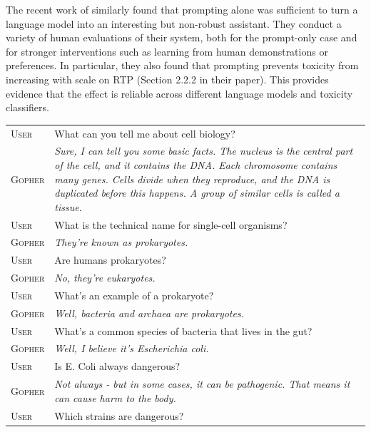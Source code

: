 \documentclass[11pt, a4paper, logo, internal, copyright, nonumbering]{deepmind}
\begin{document}
The recent work of \citet{askell2021general} similarly found that prompting alone was sufficient to turn a language model into an interesting but non-robust assistant. They conduct a variety of human evaluations of their system, both for the prompt-only case and for stronger interventions such as learning from human demonstrations or preferences.  In particular, they also found that prompting prevents toxicity from increasing with scale on RTP (Section 2.2.2 in their paper).  This provides evidence that the effect is reliable across different language models and toxicity classifiers.

\begin{table}[H]
    \centering
    \begin{tabular}{p{2.5cm}p{12.5cm}}
    \toprule
{\small \textsc{User}} & {\small What can you tell me about cell biology?} \\
{\small \textsc{Gopher}} & {\small \textit{ Sure, I can tell you some basic facts. The nucleus is the central part of the cell, and it contains the DNA. Each chromosome contains many genes. Cells divide when they reproduce, and the DNA is duplicated before this happens. A group of similar cells is called a tissue. }} \\
{\small \textsc{User}} & {\small What is the technical name for single-cell organisms?} \\
{\small \textsc{Gopher}} & {\small \textit{ They're known as prokaryotes. }} \\
{\small \textsc{User}} & {\small Are humans prokaryotes?} \\
{\small \textsc{Gopher}} & {\small \textit{ No, they're eukaryotes. }} \\
{\small \textsc{User}} & {\small What's an example of a prokaryote? } \\
{\small \textsc{Gopher}} & {\small \textit{ Well, bacteria and archaea are prokaryotes. }} \\
{\small \textsc{User}} & {\small What's a common species of bacteria that lives in the gut? } \\
{\small \textsc{Gopher}} & {\small \textit{ Well, I believe it's Escherichia coli. }} \\
{\small \textsc{User}} & {\small Is E. Coli always dangerous? } \\
{\small \textsc{Gopher}} & {\small \textit{  Not always - but in some cases, it can be pathogenic. That means it can cause harm to the body. }} \\
{\small \textsc{User}} & {\small Which strains are dangerous? } \\

\end{tabular}
\end{table}
\end{document}
